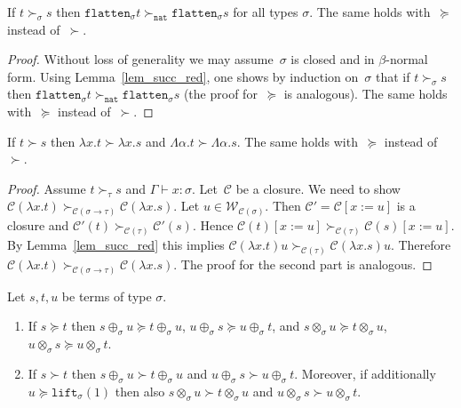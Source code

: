 \documentclass[runningheads,a4paper]{llncs}
\newcommand{\World}{\mathcal{W}}
\newcommand{\cl}{\mathcal{C}}
\newcommand{\arrtype}{\rightarrow}
\newcommand{\abs}[2]{\lambda #1.#2}
\newcommand{\tabs}[2]{\Lambda #1.#2}
\newcommand{\subst}[2]{#1:=#2}
\newcommand{\nat}{\mathtt{nat}}
\newcommand{\flatten}{\mathtt{flatten}}
\newcommand{\lift}{\mathtt{lift}}
\newcommand{\proves}{\vdash}
\begin{document}
\begin{lemma}\label{lem_flatten_succ}
  If $t \succ_\sigma s$ then $\flatten_\sigma t \succ_\nat
  \flatten_\sigma s$ for all types $\sigma$. The same holds
  with~$\succeq$ instead of~$\succ$.
\end{lemma}

\begin{proof}
  Without loss of generality we may assume~$\sigma$ is closed and in
  $\beta$-normal form. Using Lemma~\ref{lem_succ_red}, one shows by
  induction on~$\sigma$ that if $t \succ_\sigma s$ then
  $\flatten_\sigma t \succ_\nat \flatten_\sigma s$ (the proof
  for~$\succeq$ is analogous). The same holds with~$\succeq$ instead
  of~$\succ$.
\end{proof}

\begin{lemma}\label{lem_abs_succ}
  If $t \succ s$ then $\abs{x}{t} \succ \abs{x}{s}$ and
  $\tabs{\alpha}{t} \succ \tabs{\alpha}{s}$. The same holds
  with~$\succeq$ instead of~$\succ$.
\end{lemma}

\begin{proof}
  Assume $t \succ_\tau s$ and $\Gamma \proves x : \sigma$. Let~$\cl$
  be a closure. We need to show $\cl(\abs{x}{t})
  \succ_{\cl(\sigma\arrtype\tau)} \cl(\abs{x}{s})$. Let $u \in
  \World_{\cl(\sigma)}$. Then $\cl' = \cl[\subst{x}{u}]$ is a closure
  and $\cl'(t) \succ_{\cl(\tau)} \cl'(s)$. Hence $\cl(t)[\subst{x}{u}]
  \succ_{\cl(\tau)} \cl(s)[\subst{x}{u}]$. By Lemma~\ref{lem_succ_red}
  this implies $\cl(\abs{x}{t}) u \succ_{\cl(\tau)} \cl(\abs{x}{s})
  u$. Therefore $\cl(\abs{x}{t}) \succ_{\cl(\sigma\arrtype\tau)}
  \cl(\abs{x}{s})$. The proof for the second part is analogous.
\end{proof}

\begin{lemma}\label{lem:plustimesmonotonic}
  Let $s,t,u$ be terms of type $\sigma$.
  \begin{enumerate}
  \item If $s \succeq t$ then $s \oplus_\sigma u \succeq t
    \oplus_\sigma u$, $u \oplus_\sigma s \succeq u \oplus_\sigma t$,
    and $s \otimes_\sigma u \succeq t \otimes_\sigma u$, $u
    \otimes_\sigma s \succeq u \otimes_\sigma t$.
  \item If $s \succ t$ then $s \oplus_\sigma u \succ t \oplus_\sigma
    u$ and $u \oplus_\sigma s \succ u \oplus_\sigma t$. Moreover, if
    additionally $u \succeq \lift_\sigma(1)$ then also $s
    \otimes_\sigma u \succ t \otimes_\sigma u$ and $u \otimes_\sigma s
    \succ u \otimes_\sigma t$.
  \end{enumerate}
\end{lemma}
\end{document}
